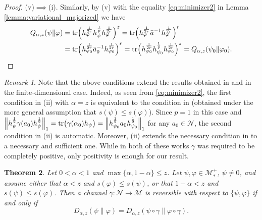 \documentclass[12pt]{article}
\newtheorem{theorem}{Theorem}[section]
\theoremstyle{definition}
\theoremstyle{remark}
\newtheorem{remark}[theorem]{Remark}
\numberwithin{equation}{section}
\def\Me{\mathcal M}
\def\Ne{\mathcal N}
\def\Tr{\mathrm{tr}}
\def\ffi{\varphi}
\begin{document}
\begin{proof}
(v)$\implies$(i).\enspace
Similarly, by (v) with the equality \eqref{eq:minimizer2} in Lemma
\ref{lemma:variational_majorized} we have
\begin{align*}
Q_{\alpha,z}(\psi\|\ffi)
&=\Tr\Bigl(h_\ffi^{1\over2r}h_\psi^{1\over p}h_\ffi^{1\over2r}\Bigr)^z
=\Tr\Bigl(h_\ffi^{1\over2r}\bar a^{-1}h_\ffi^{1\over2r}\Bigr)^{r} \\
&=\Tr\Bigl(h_{\ffi_0}^{1\over2r}\bar a_0^{-1}h_{\ffi_0}^{1\over2r}\Bigr)^{r}
=\Tr\Bigl(h_{\ffi_0}^{1\over2r}h_{\psi_0}^{1\over p}h_{\ffi_0}^{1\over2r}\Bigr)^z
=Q_{\alpha,z}(\psi_0\|\ffi_0).
\end{align*}
\end{proof}


\begin{remark}\label{rem:conditions} Note that the above conditions extend the results
obtained in \cite{leditzky2017data} and \cite{zhang2020equality} in the finite-dimensional case.
Indeed,  {\color{orange} as seen from \eqref{eq:minimizer2}, the first condition in (ii) with $\alpha=z$ is 
equivalent to the condition in \cite[Theorem 1]{leditzky2017data} (obtained under the more
general assumption that $s(\psi)\le s(\ffi)$). Since $p=1$ in this case and 
$\Big\|h_\psi^{1\over2}\gamma(a_0)h_\psi^{1\over2}\Big\|_{1}=\Tr
\bigl(\gamma(\alpha_0)h_\psi\bigr)=\Big\|h_{\psi_0}^{1\over2}a_0h_{\psi_0}^{1\over2}\Big\|_{1}$
for any $a_0\in \Ne$, the second condition in (ii) is automatic.}
Moreover, (ii) extends the necessary condition in \cite[Theorem 1.2(2)]{zhang2020equality}
to a necessary and sufficient one. While in both {of} these works $\gamma$ was required
to be completely positive, only positivity is enough for our result. 
\end{remark}


\begin{theorem}\label{thm:suffle1} Let $0<\alpha<1$ and $\max\{\alpha,1-\alpha\}\le
z$. Let $\psi,\varphi\in \Me_*^+$, $\psi\ne0$, and assume either that $\alpha<z$ and $s(\ffi)\le
s(\psi)$, or that $1-\alpha<z$ and $s(\psi)\le s(\ffi)$. 
Then a channel $\gamma:\Ne \to \Me$ is reversible with respect to
$\{\psi,\varphi\}$ if and only if
\[
D_{\alpha,z}(\psi\|\varphi)=D_{\alpha,z}(\psi\circ\gamma\|\varphi\circ\gamma).
\]

\end{theorem}
\end{document}
